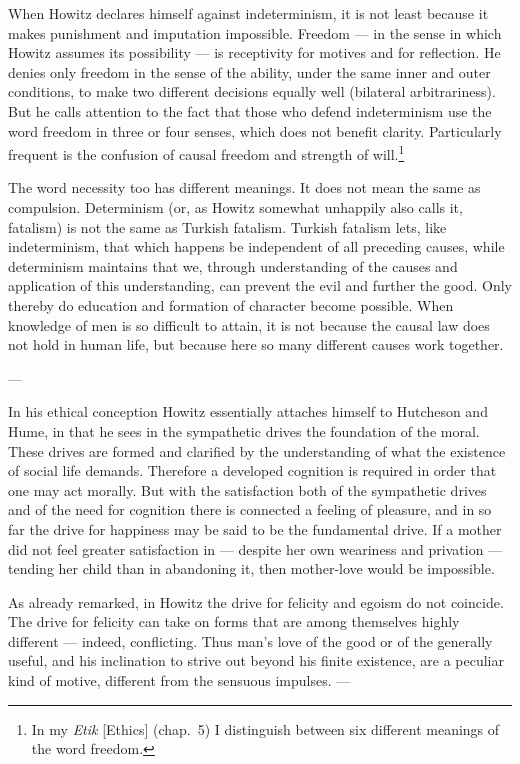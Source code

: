 \documentclass[12pt,a4paper]{book}
\newcommand{\opage}[1]{\marginnote{\footnotesize\textit{[#1]}}}
\begin{document}
When Howitz declares himself against indeterminism, it is not least because it makes
punishment and imputation impossible. Freedom --- in the sense in which Howitz assumes its
possibility --- is receptivity for motives and for reflection. He denies only freedom in
the sense of the ability, under the same inner and outer conditions, to make two different
decisions equally well (bilateral arbitrariness). But he calls attention to the fact that
those who defend indeterminism use the word freedom in three or four senses, which does not
benefit clarity. Particularly frequent is the confusion of causal freedom and strength of
will.\footnote{In my \emph{Etik} [Ethics] (chap.~5) I distinguish between six different
meanings of the word freedom.}

The word necessity too has different meanings. It does not mean the same as compulsion.
Determinism (or, as Howitz somewhat unhappily also calls it, fatalism) is not the same as
Turkish fatalism. Turkish fatalism lets, like indeterminism, that which happens be
independent of all preceding causes, while determinism maintains that we, through
understanding of the causes and application of this understanding, can prevent the evil and
further the good. Only thereby do education and formation of character become possible.
When knowledge of men is so difficult to attain, it is not because the causal law does not
hold in human life, but because here so many different causes work together.

\begin{center}---\end{center}

In his ethical conception Howitz essentially attaches himself to Hutcheson and Hume, in
that he sees in the sympathetic drives the foundation of the moral. These drives are formed
and clarified by the understanding of what the existence of social life demands. Therefore
a developed cognition is required in order that one may act morally. But with the
\opage{88}satisfaction both of the sympathetic drives and of the need for cognition there is
connected a feeling of pleasure, and in so far the drive for happiness may be said to be
the fundamental drive. If a mother did not feel greater satisfaction in --- despite her own
weariness and privation --- tending her child than in abandoning it, then mother-love would
be impossible.

As already remarked, in Howitz the drive for felicity and egoism do not coincide. The drive
for felicity can take on forms that are among themselves highly different --- indeed,
conflicting. Thus man's love of the good or of the generally useful, and his inclination to
strive out beyond his finite existence, are a peculiar kind of motive, different from the
sensuous impulses. ---
\end{document}
